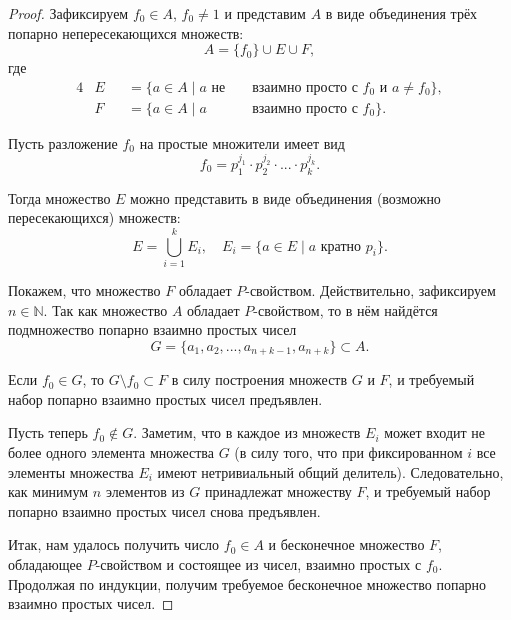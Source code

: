 \documentclass[a4paper,openbib]{article}
\theoremstyle{definition}
\begin{document}
\begin{proof}
	Зафиксируем $f_0\in A$, $f_0 \neq 1$ и представим $A$ в виде объединения трёх попарно непересекающихся множеств:
	\begin{equation}
		A = \{f_0\} \cup E \cup F
		,
	\end{equation}
	где
	\begin{alignat*}{4}
		& E &&= \{ a \in A \mid a \mbox{~не~}&&\mbox{взаимно просто с~} f_0 \mbox{~и~} a\neq f_0\}
		,
		\\
		& F &&= \{ a \in A \mid a            &&\mbox{взаимно просто с~} f_0 \}
		.
	\end{alignat*}

	Пусть разложение $f_0$ на простые множители имеет вид
	\begin{equation}
		f_0 = p_1^{j_1} \cdot p_2^{j_2} \cdot ... \cdot p_k^{j_k}
		.
	\end{equation}

	Тогда множество $E$ можно представить в виде объединения (возможно пересекающихся) множеств:
	\begin{equation}
		E = \bigcup_{i=1}^{k} E_i,\quad E_i = \{a\in E \mid a \mbox{~кратно~} p_i\}
		.
	\end{equation}

	Покажем, что множество $F$ обладает $P$-свойством.
	Действительно, зафиксируем $n\in\mathbb{N}$.
	Так как множество $A$ обладает $P$-свойством,
	то в нём найдётся подмножество попарно взаимно простых чисел
	$$G=\{a_1, a_2, ..., a_{n+k-1}, a_{n+k}\}\subset A.$$

	Если $f_0\in G$, то $G\setminus f_0 \subset F$ в силу построения множеств $G$ и $F$, и требуемый набор попарно взаимно простых чисел предъявлен.

	Пусть теперь $f_0\notin G$.
	Заметим, что в каждое из множеств $E_i$ может входит не более одного элемента множества $G$
	(в силу того, что при фиксированном $i$ все элементы множества $E_i$ имеют нетривиальный общий делитель).
	Следовательно, как минимум $n$ элементов из $G$ принадлежат множеству $F$,
	и требуемый набор попарно взаимно простых чисел снова предъявлен.


	Итак, нам удалось получить число $f_0\in A$ и бесконечное множество $F$, обладающее $P$-свойством
	и состоящее из чисел, взаимно простых с $f_0$.
	Продолжая по индукции, получим требуемое бесконечное множество попарно взаимно простых чисел.
\end{proof}
\end{document}
